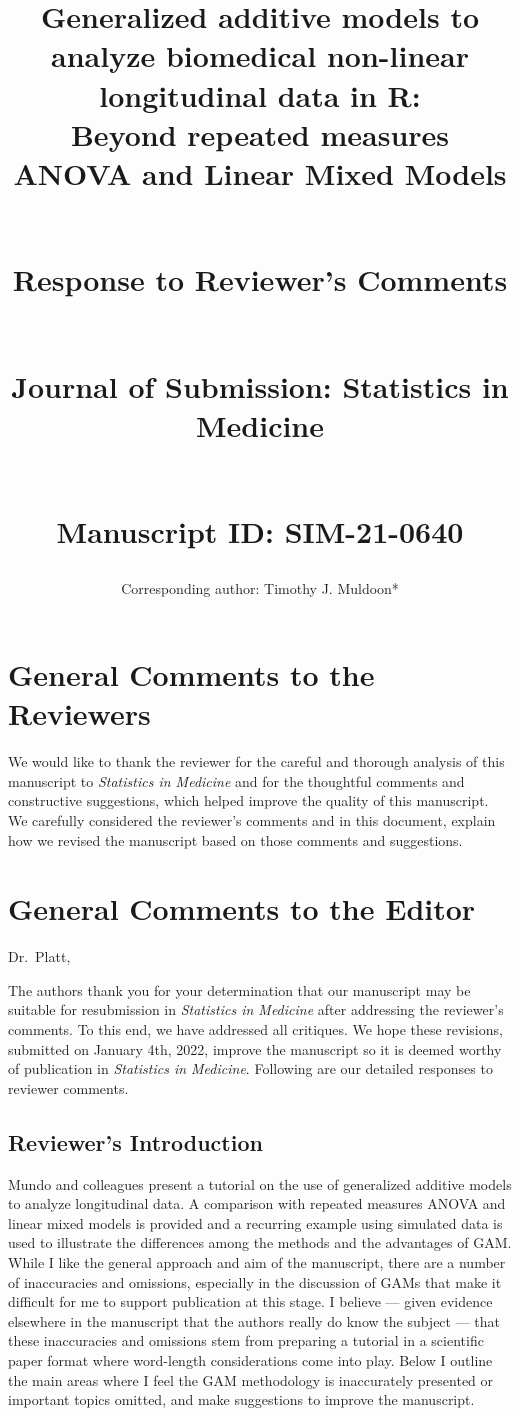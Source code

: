 \documentclass[
]{article}
\author{Corresponding author: Timothy J. Muldoon*}
\affil{Department of Biomedical Engineering, University of Arkansas, Fayetteville, AR, USA}
\affil{tmuldoon@uark.edu}
\title{\textbf{Generalized additive models to analyze biomedical non-linear longitudinal data in R:}\\
Beyond repeated measures ANOVA and Linear Mixed Models\\
\strut \\
\textbf{Response to Reviewer's Comments}\\
\strut \\
Journal of Submission: Statistics in Medicine\\
\strut \\
Manuscript ID: SIM-21-0640}
\author{}
\date{\vspace{-2.5em}}
\begin{document}
\maketitle

\hypertarget{general-comments-to-the-reviewers}{%
\section{General Comments to the Reviewers}\label{general-comments-to-the-reviewers}}

We would like to thank the reviewer for the careful and thorough analysis of this manuscript to \emph{Statistics in Medicine} and for the thoughtful comments and constructive suggestions, which helped improve the quality of this manuscript. We carefully considered the reviewer's comments and in this document, explain how we revised the manuscript based on those comments and suggestions.

\hypertarget{general-comments-to-the-editor}{%
\section{General Comments to the Editor}\label{general-comments-to-the-editor}}

Dr.~Platt,

The authors thank you for your determination that our manuscript may be suitable for resubmission in \emph{Statistics in Medicine} after addressing the reviewer's comments. To this end, we have addressed all critiques. We hope these revisions, submitted on January 4th, 2022, improve the manuscript so it is deemed worthy of publication in \emph{Statistics in Medicine}. Following are our detailed responses to reviewer comments.

\hypertarget{reviewers-introduction}{%
\subsection{Reviewer's Introduction}\label{reviewers-introduction}}

Mundo and colleagues present a tutorial on the use of generalized additive models to analyze longitudinal data. A comparison with repeated measures ANOVA and linear mixed models is provided and a recurring example using simulated
data is used to illustrate the differences among the methods and the advantages of GAM. While I like the general approach and aim of the manuscript, there are a number of inaccuracies and omissions, especially in the discussion of GAMs that make it difficult for me to support publication at this stage. I believe --- given evidence elsewhere in the manuscript that the authors really do know the subject --- that these inaccuracies and omissions stem from preparing a tutorial in a scientific paper format where word-length considerations come into play. Below I outline the main areas where I feel the GAM methodology is inaccurately presented or important topics omitted, and make suggestions to improve the manuscript.
\end{document}
